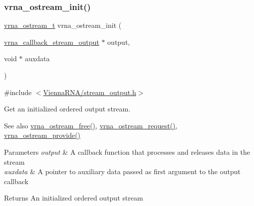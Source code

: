 \subsubsection{\texorpdfstring{vrna\+\_\+ostream\+\_\+init()}{vrna\_ostream\_init()}}
{\footnotesize\ttfamily \hyperlink{group__buffer__utils_ga8da189552af21ab6e4e88bdcc240870c}{vrna\+\_\+ostream\+\_\+t} vrna\+\_\+ostream\+\_\+init (\begin{DoxyParamCaption}\item[{\hyperlink{group__buffer__utils_ga4adb94338a6f0a1a451e03c1bdac0d9d}{vrna\+\_\+callback\+\_\+stream\+\_\+output} $\ast$}]{output,  }\item[{void $\ast$}]{auxdata }\end{DoxyParamCaption})}



{\ttfamily \#include $<$\hyperlink{stream__output_8h}{Vienna\+R\+N\+A/stream\+\_\+output.\+h}$>$}



Get an initialized ordered output stream. 

\begin{DoxySeeAlso}{See also}
\hyperlink{group__buffer__utils_gaf813ec90e1446ba82c89f9a39688a3b3}{vrna\+\_\+ostream\+\_\+free()}, \hyperlink{group__buffer__utils_gaebca91932705d71bcbf00bd8d82bd7c8}{vrna\+\_\+ostream\+\_\+request()}, \hyperlink{group__buffer__utils_ga6253c42abdeaf3b41a38204865e1f0f7}{vrna\+\_\+ostream\+\_\+provide()}
\end{DoxySeeAlso}

\begin{DoxyParams}{Parameters}
{\em output} & A callback function that processes and releases data in the stream \\
\hline
{\em auxdata} & A pointer to auxiliary data passed as first argument to the {\ttfamily output} callback \\
\hline
\end{DoxyParams}
\begin{DoxyReturn}{Returns}
An initialized ordered output stream 
\end{DoxyReturn}
\mbox{\label{group__buffer__utils_gaf813ec90e1446ba82c89f9a39688a3b3}} 
